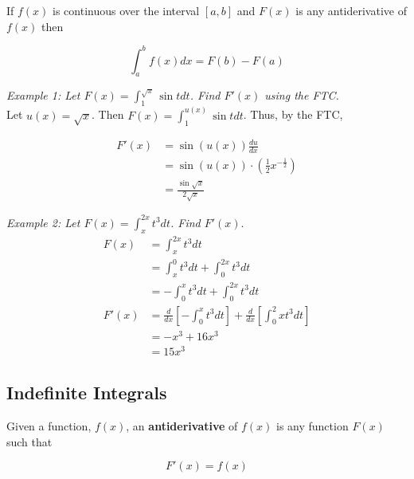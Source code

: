         \noindent If $f(x)$ is continuous over the interval $[a,b]$ and $F(x)$ is any
        antiderivative of $f(x)$ then

        \begin{equation*}
            \int^b_a f(x)dx = F(b) - F(a)
        \end{equation*}

        \pagebreak
        \noindent \color{blue} \textit{Example 1: Let $F(x)=\int_1^{\sqrt{x}}\sin{t} dt$.
        Find $F'(x)$ using the FTC.} \color{black} \\

        \noindent Let $u(x)=\sqrt{x}$. Then $F(x)=\int_1^{u(x)}\sin{t}dt$. Thus, by the FTC,

        \begin{align*}
            F'(x) &= \sin{(u(x))}\frac{du}{dx} \\
            &= \sin{(u(x))}\cdot\left(\frac{1}{2}x^{-\frac{1}{2}}\right) \\
            &= \frac{\sin{\sqrt{x}}}{2\sqrt{x}}
        \end{align*}

        \noindent \color{blue} \textit{Example 2: Let $F(x)=\int^{2x}_x t^3 dt$. Find $F'(x).$}
        \color{black} \\

        \begin{align*}
            F(x)    &= \int_x^{2x} t^3 dt \\
            &= \int_x^0 t^3 dt + \int_0^{2x} t^3 dt \\
            &= -\int_0^x t^3 dt + \int_0^{2x} t^3 dt \\
            F'(x)   &= \frac{d}{dx}\left[-\int_0^x t^3 dt\right] +
            \frac{d}{dx}\left[\int_0^2x t^3 dt\right] \\
            &= -x^3 + 16x^3 \\
            &= 15x^3
        \end{align*}



    \subsection{Indefinite Integrals}
        Given a function, $f(x)$, an \textbf{antiderivative} of $f(x)$ is any function $F(x)$ such that

        \begin{equation*}
            F'(x) = f(x)
        \end{equation*}

